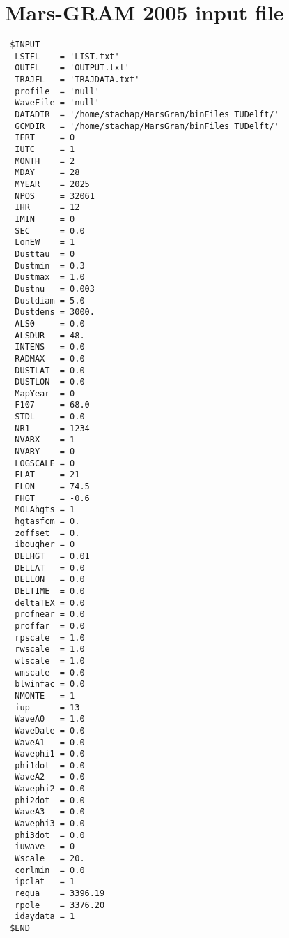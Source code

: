 \chapter{Mars-\ac{GRAM} 2005 input file}
\label{app:appendixA-marsGRAM-inputFile}

\begin{lstlisting}
 $INPUT
  LSTFL    = 'LIST.txt'
  OUTFL    = 'OUTPUT.txt'
  TRAJFL   = 'TRAJDATA.txt'
  profile  = 'null'
  WaveFile = 'null'
  DATADIR  = '/home/stachap/MarsGram/binFiles_TUDelft/'
  GCMDIR   = '/home/stachap/MarsGram/binFiles_TUDelft/'
  IERT     = 0
  IUTC     = 1
  MONTH    = 2
  MDAY     = 28
  MYEAR    = 2025
  NPOS     = 32061
  IHR      = 12
  IMIN     = 0
  SEC      = 0.0
  LonEW    = 1
  Dusttau  = 0
  Dustmin  = 0.3
  Dustmax  = 1.0
  Dustnu   = 0.003
  Dustdiam = 5.0
  Dustdens = 3000.
  ALS0     = 0.0
  ALSDUR   = 48.
  INTENS   = 0.0
  RADMAX   = 0.0
  DUSTLAT  = 0.0
  DUSTLON  = 0.0
  MapYear  = 0
  F107     = 68.0
  STDL	   = 0.0
  NR1      = 1234
  NVARX    = 1
  NVARY    = 0
  LOGSCALE = 0
  FLAT     = 21
  FLON     = 74.5
  FHGT     = -0.6
  MOLAhgts = 1
  hgtasfcm = 0.
  zoffset  = 0.
  ibougher = 0
  DELHGT   = 0.01
  DELLAT   = 0.0
  DELLON   = 0.0
  DELTIME  = 0.0
  deltaTEX = 0.0
  profnear = 0.0
  proffar  = 0.0
  rpscale  = 1.0
  rwscale  = 1.0
  wlscale  = 1.0
  wmscale  = 0.0
  blwinfac = 0.0
  NMONTE   = 1
  iup      = 13
  WaveA0   = 1.0
  WaveDate = 0.0
  WaveA1   = 0.0
  Wavephi1 = 0.0
  phi1dot  = 0.0
  WaveA2   = 0.0
  Wavephi2 = 0.0
  phi2dot  = 0.0
  WaveA3   = 0.0
  Wavephi3 = 0.0
  phi3dot  = 0.0
  iuwave   = 0
  Wscale   = 20.
  corlmin  = 0.0
  ipclat   = 1
  requa    = 3396.19
  rpole    = 3376.20
  idaydata = 1
 $END


\end{lstlisting}
